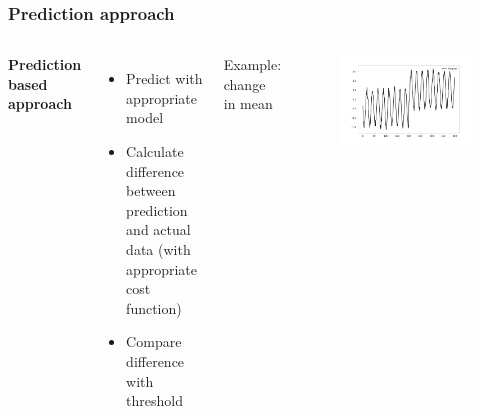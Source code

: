 \documentclass[intlimits, 9pt, unicode]{beamer}
\begin{document}
\begin{frame}
    \frametitle{Prediction approach}

  \begin{columns}[T,onlytextwidth]
	\textbf{Prediction based approach}
	    \begin{itemize}
	    	\item Predict with appropriate model
		\item Calculate difference between prediction and actual data (with appropriate cost function)
		\item Compare difference with threshold
	    \end{itemize}
      Example: change in mean
      \begin{figure}
	\includegraphics[scale=0.2]{images/approaches_first_1}
	\end{figure}
     \end{columns}

\end{frame}
\end{document}
